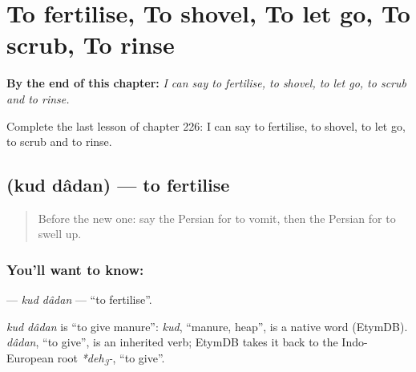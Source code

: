 
\chapter{To fertilise, To shovel, To let go, To scrub, To rinse}
\label{ch:fa-to-fertilise-to-shovel-to-let-go-to-scrub-to-rinse}

\begin{chapteropening}
\textbf{By the end of this chapter:} \emph{I can say to fertilise, to shovel, to let go, to scrub and to rinse.}

Complete the last lesson of chapter 226: I can say to fertilise, to shovel, to let go, to scrub and to rinse.
\end{chapteropening}

\section[\texorpdfstring{\fa{کود} \fa{دادن} (kud dâdan)}{کود دادن (kud dâdan)}]{  (kud dâdan) — to fertilise}

\label{lesson:FA-C226-kud-dadan}



\begin{quote}
Before the new one: say the Persian for to vomit, then the Persian for to swell up.
\end{quote}

\subsection*{You'll want to know:  }
\textbf{ } — \emph{kud dâdan} — \textquotedblleft{}to fertilise\textquotedblright{}.

\begin{cousinweb}
\emph{kud dâdan} is \textquotedblleft{}to give manure\textquotedblright{}: \emph{kud}, \textquotedblleft{}manure, heap\textquotedblright{}, is a native word (EtymDB). \emph{dâdan}, \textquotedblleft{}to give\textquotedblright{}, is an inherited verb; EtymDB takes it back to the Indo-European root \emph{*deh\textsubscript{3}-}, \textquotedblleft{}to give\textquotedblright{}.
\end{cousinweb}

